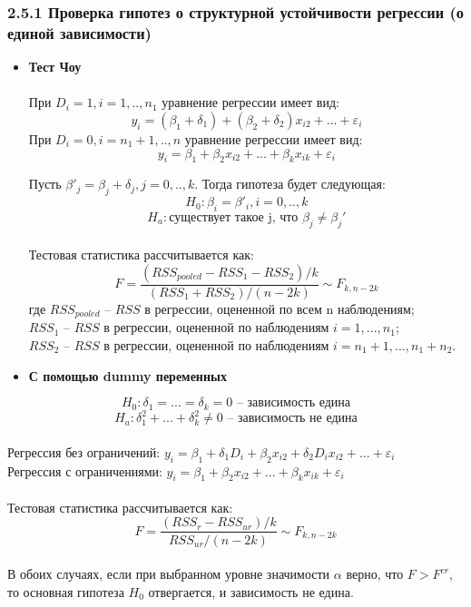\documentclass[a0,final]{a0poster}
\begin{document}
\begin{multicols}{4}
\subsubsection*{2.5.1 Проверка гипотез о структурной устойчивости регрессии (о единой зависимости)}
\begin{itemize}
\item \textbf{Тест Чоу} \\
\\
При $D_i = 1, i = 1,..,n_1$ уравнение регрессии имеет вид:
\[y_i=({\beta}_1+\delta_1) +({\beta}_2+\delta_2)x_{i2} + ... + {\varepsilon}_i\]
При $D_i = 0, i = n_1+1,..,n$ уравнение регрессии имеет вид:
\[y_i={\beta}_1 +{\beta}_2x_{i2} + ... + \beta_kx_{ik} + {\varepsilon}_i \]
\columnbreak

Пусть $\beta'_j = \beta_j+\delta_j, j = 0,..,k$. Тогда гипотеза будет следующая:
\[H_0: \beta_i = \beta'_i, i = 0,..,k\]
\[H_a: \text{существует такое j, что } \beta_j \ne \beta_j'\]
\\
Тестовая статистика рассчитывается как:
\[F = \frac{(RSS_{pooled} - RSS_1-RSS_2)/k}{(RSS_1+RSS_2)/(n-2k)} \sim F_{k, n-2k}\]
где $RSS_{pooled}$ -- $RSS$ в регрессии, оцененной по всем n наблюдениям; \\
$RSS_1$ -- $RSS$ в регрессии, оцененной по наблюдениям $i=1,...,n_1$; \\
$RSS_2$ -- $RSS$ в регрессии, оцененной по наблюдениям $i=n_1+1,...,n_1+n_2$.\\

\item \textbf{С помощью dummy переменных}
\\
\end{itemize}
\[H_0: \delta_1 = ... = \delta_k = 0 \text{ -- зависимость едина}\]
\[H_a: \delta^2_1 + ... + \delta^2_k \ne 0 \text{ -- зависимость не едина}\]
\\
Регрессия без ограничений: $y_i={\beta}_1 + \delta_1D_i +{\beta}_2x_{i2} + \delta_2D_ix_{i2} + ... + {\varepsilon}_i$ \\
Регрессия с ограничениями: $y_i={\beta}_1 +{\beta}_2x_{i2} + ... + \beta_kx_{ik} + {\varepsilon}_i$ \\
\\
Тестовая статистика рассчитывается как:
\[F = \frac{(RSS_r - RSS_{ur})/k}{RSS_{ur}/(n-2k)} \sim F_{k, n-2k}\]
\\
В обоих случаях, если при выбранном уровне значимости $\alpha$ верно, что $F > F^{cr}$, то основная гипотеза $H_0$ отвергается, и зависимость не едина.



\end{multicols}
\end{document}
